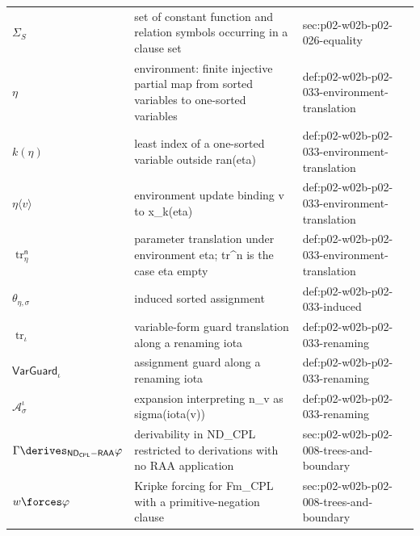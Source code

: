 \begin{longtable}{@{}p{}p{}p{}@{}}
\(\Sigma_S\) & set of constant function and relation symbols occurring in a clause set & sec:\allowbreak{}p02-\allowbreak{}w02b-\allowbreak{}p02-\allowbreak{}026-\allowbreak{}equality \\
\(\eta\) & environment: finite injective partial map from sorted variables to one-sorted variables & def:\allowbreak{}p02-\allowbreak{}w02b-\allowbreak{}p02-\allowbreak{}033-\allowbreak{}environment-\allowbreak{}translation \\
\(k(\eta)\) & least index of a one-sorted variable outside ran(eta) & def:\allowbreak{}p02-\allowbreak{}w02b-\allowbreak{}p02-\allowbreak{}033-\allowbreak{}environment-\allowbreak{}translation \\
\(\eta\langle v\rangle\) & environment update binding v to x\_{k(eta)} & def:\allowbreak{}p02-\allowbreak{}w02b-\allowbreak{}p02-\allowbreak{}033-\allowbreak{}environment-\allowbreak{}translation \\
\(\operatorname{tr}^{\mathsf n}_{\eta}\) & parameter translation under environment eta; tr\^{}n is the case eta empty & def:\allowbreak{}p02-\allowbreak{}w02b-\allowbreak{}p02-\allowbreak{}033-\allowbreak{}environment-\allowbreak{}translation \\
\(\theta_{\eta,\sigma}\) & induced sorted assignment & def:\allowbreak{}p02-\allowbreak{}w02b-\allowbreak{}p02-\allowbreak{}033-\allowbreak{}induced \\
\(\operatorname{tr}_{\iota}\) & variable-form guard translation along a renaming iota & def:\allowbreak{}p02-\allowbreak{}w02b-\allowbreak{}p02-\allowbreak{}033-\allowbreak{}renaming \\
\(\mathsf{VarGuard}_{\iota}\) & assignment guard along a renaming iota & def:\allowbreak{}p02-\allowbreak{}w02b-\allowbreak{}p02-\allowbreak{}033-\allowbreak{}renaming \\
\(\mathcal A_{\sigma}^{\iota}\) & expansion interpreting n\_v as sigma(iota(v)) & def:\allowbreak{}p02-\allowbreak{}w02b-\allowbreak{}p02-\allowbreak{}033-\allowbreak{}renaming \\
\(\Gamma\derives_{\mathsf{ND}_{\mathsf{CPL}}-\mathsf{RAA}}\varphi\) & derivability in ND\_CPL restricted to derivations with no RAA application & sec:\allowbreak{}p02-\allowbreak{}w02b-\allowbreak{}p02-\allowbreak{}008-\allowbreak{}trees-\allowbreak{}and-\allowbreak{}boundary \\
\(w\forces\varphi\) & Kripke forcing for Fm\_CPL with a primitive-negation clause & sec:\allowbreak{}p02-\allowbreak{}w02b-\allowbreak{}p02-\allowbreak{}008-\allowbreak{}trees-\allowbreak{}and-\allowbreak{}boundary \\

\end{longtable}
